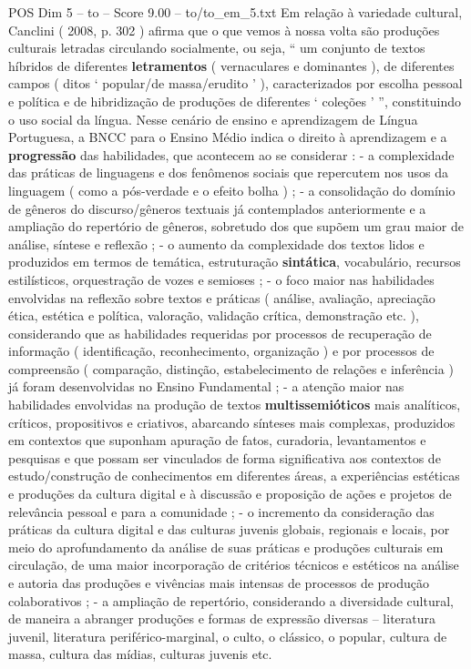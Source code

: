 \begin{textsample}{POS Dim 5 – to – Score 9.00 – to/to\_em\_5.txt}
Em relação à variedade cultural, Canclini ( 2008, p. 302 ) afirma que o que vemos à nossa volta são produções culturais letradas circulando socialmente, ou seja, “ um conjunto de textos híbridos de diferentes \textbf{letramentos} ( vernaculares e dominantes ), de diferentes campos ( ditos ‘ popular/de massa/erudito ’ ), caracterizados por escolha pessoal e política e de hibridização de produções de diferentes ‘ coleções ’ ”, constituindo o uso social da língua.
Nesse cenário de ensino e aprendizagem de Língua Portuguesa, a BNCC para o Ensino Médio indica o direito à aprendizagem e a \textbf{progressão} das habilidades, que acontecem ao se considerar : - a complexidade das práticas de linguagens e dos fenômenos sociais que repercutem nos usos da linguagem ( como a pós-verdade e o efeito bolha ) ; - a consolidação do domínio de gêneros do discurso/gêneros textuais já contemplados anteriormente e a ampliação do repertório de gêneros, sobretudo dos que supõem um grau maior de análise, síntese e reflexão ; - o aumento da complexidade dos textos lidos e produzidos em termos de temática, estruturação \textbf{sintática}, vocabulário, recursos estilísticos, orquestração de vozes e semioses ; - o foco maior nas habilidades envolvidas na reflexão sobre textos e práticas ( análise, avaliação, apreciação ética, estética e política, valoração, validação crítica, demonstração etc. ), considerando que as habilidades requeridas por processos de recuperação de informação ( identificação, reconhecimento, organização ) e por processos de compreensão ( comparação, distinção, estabelecimento de relações e inferência ) já foram desenvolvidas no Ensino Fundamental ; - a atenção maior nas habilidades envolvidas na produção de textos \textbf{multissemióticos} mais analíticos, críticos, propositivos e criativos, abarcando sínteses mais complexas, produzidos em contextos que suponham apuração de fatos, curadoria, levantamentos e pesquisas e que possam ser vinculados de forma significativa aos contextos de estudo/construção de conhecimentos em diferentes áreas, a experiências estéticas e produções da cultura digital e à discussão e proposição de ações e projetos de relevância pessoal e para a comunidade ; - o incremento da consideração das práticas da cultura digital e das culturas juvenis globais, regionais e locais, por meio do aprofundamento da análise de suas práticas e produções culturais em circulação, de uma maior incorporação de critérios técnicos e estéticos na análise e autoria das produções e vivências mais intensas de processos de produção colaborativos ; - a ampliação de repertório, considerando a diversidade cultural, de maneira a abranger produções e formas de expressão diversas – literatura juvenil, literatura periférico-marginal, o culto, o clássico, o popular, cultura de massa, cultura das mídias, culturas juvenis etc.

\end{textsample}
